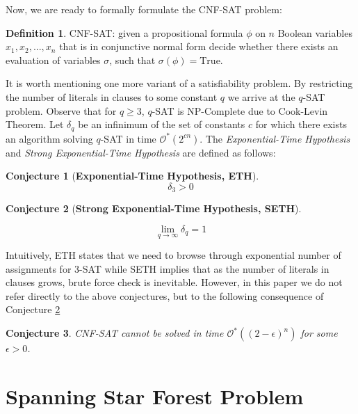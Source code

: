 \documentclass[en]{pracamgr}
\newtheorem{conjecture}{Conjecture}
\theoremstyle{definition}
\newtheorem{definition}{Definition}
\newcommand{\cnfsat}{{\sc CNF-SAT}}
\newcommand{\true}{\textrm{True}}
\begin{document}
Now, we are ready to formally formulate the \cnfsat{} problem:

\begin{definition}
	\cnfsat{}: given a propositional formula $\phi$ on $n$ Boolean variables $x_1,x_2,...,x_n$ that is in conjunctive normal form decide whether there exists an evaluation of variables $\sigma$, such that $\sigma(\phi)=\true$.
\end{definition}

It is worth mentioning one more variant of a satisfiability problem. By restricting the number of literals in clauses to some constant $q$ we arrive at the $q$-{\sc SAT} problem. Observe that for $q \geq 3$, $q$-{\sc SAT} is NP-Complete due to Cook-Levin Theorem. Let $\delta_q$ be an infinimum of the set of constants $c$ for which there exists an algorithm solving $q$-{\sc SAT} in time $\mathcal{O}^*(2^{cn})$. The \textit{Exponential-Time Hypothesis} and \textit{Strong Exponential-Time Hypothesis} are defined as follows:

\begin{conjecture}[\textbf{Exponential-Time Hypothesis, ETH}]

\begin{equation*}
	\delta_3 > 0
\end{equation*}
\end{conjecture}

\begin{conjecture}[\textbf{Strong Exponential-Time Hypothesis, SETH}]\label{SETH}
	
	\begin{equation*}
	\lim\limits_{q \rightarrow \infty}\delta_q = 1
	\end{equation*}
\end{conjecture}

Intuitively, ETH states that we need to browse through exponential number of assignments for $3$-{\sc SAT} while SETH implies that as the number of literals in clauses grows, brute force check is inevitable. However, in this paper we do not refer directly to the above conjectures, but to the following consequence of Conjecture \ref{SETH}

\begin{conjecture}
	\cnfsat{} cannot be solved in time $\mathcal{O}^*((2-\epsilon)^n)$ for some $\epsilon>0$.
\end{conjecture}

\chapter{Spanning Star Forest Problem}\label{sec3}
\end{document}
